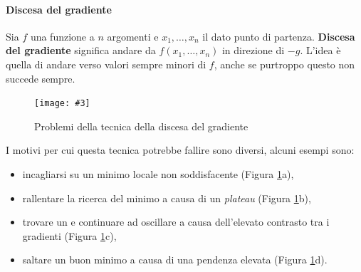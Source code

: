 \documentclass[12pt, twoside, letterpaper]{report}
\newcommand{\img}[4] {
	\begin{figure}
		\centering
		\texttt{[image: \#3]}\\
		\caption{#1}
		\label{fig:#4}
	\end{figure}
}
\begin{document}
				\paragraph{Discesa del gradiente} Sia $f$ una funzione a $n$ argomenti e $x_1, \dots, x_n$ il dato punto di partenza. \textbf{Discesa del gradiente} significa andare da $f(x_1, \dots, x_n)$ in direzione di $-g$. L'idea è quella di andare verso valori sempre minori di $f$, anche se purtroppo questo non succede sempre.
				\img{Problemi della tecnica della discesa del gradiente \cite{kriesel}}{0.4}{gradient_descent.png}{gradient_descent_problemi}
				I motivi per cui questa tecnica potrebbe fallire sono diversi, alcuni esempi sono: 
				\begin{itemize}
				 	\item incagliarsi su un minimo locale non soddisfacente (Figura \ref{fig:gradient_descent_problemi}a),
				 	\item rallentare la ricerca del minimo a causa di un \textit{plateau} (Figura \ref{fig:gradient_descent_problemi}b),
				 	\item trovare un  e continuare ad oscillare a causa dell'elevato contrasto tra i gradienti (Figura \ref{fig:gradient_descent_problemi}c),
				 	\item saltare un buon minimo a causa di una pendenza elevata (Figura \ref{fig:gradient_descent_problemi}d).
				 \end{itemize} 
				 
\end{document}
